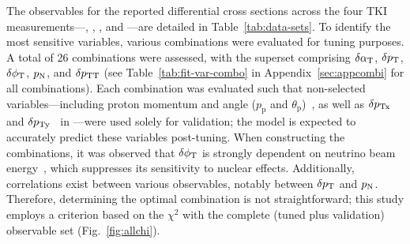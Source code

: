The observables for the reported differential cross sections across the four TKI measurements---\ttkzpi, \ttkpip, \minzpi, and \minpiz---are detailed in Table~\ref{tab:data-sets}. To identify the most sensitive variables, various combinations were evaluated  for tuning purposes. A total of 26 combinations were assessed,  with the superset comprising $\delta\alpha_\textrm{T}$, $\delta p_\textrm{T}$, $\delta\phi_\textrm{T}$, $p_\textrm{N}$, and $\delta p_\textrm{TT}$ (see Table~\ref{tab:fit-var-combo} in Appendix~\ref{sec:appcombi} for all combinations). Each combination was evaluated such that non-selected variables---including proton momentum and angle ($p_\text{p}$ and $\theta_\text{p}$)~\cite{MINERvA:2018hba}, as well as $\delta p_\textrm{Tx}$ and $\delta p_\textrm{Ty}$~\cite{MINERvA:2019ope} in \minzpi---were used solely for validation; the model is expected to accurately predict these variables post-tuning. When constructing the combinations, it was observed that $\delta\phi_\textrm{T}$ is strongly dependent  on neutrino beam energy~\cite{Lu:2015tcr}, which suppresses its sensitivity to nuclear effects. Additionally, correlations exist between various observables, notably between $\delta p_\textrm{T}$ and $p_\textrm{N}$. Therefore, determining the optimal combination is not straightforward; this study employs a criterion based on  the $\chi^2$ with the complete (tuned plus validation) observable set (Fig.~\ref{fig:allchi}).


